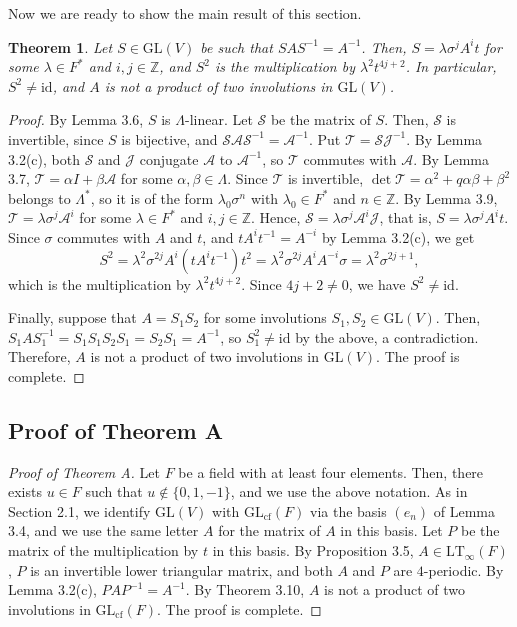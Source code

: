 \documentclass[11pt,reqno,a4paper]{amsart}
\numberwithin{equation}{section}
\newtheorem{theorem}{Theorem}[section]
\theoremstyle{definition}
\theoremstyle{plain}
\newcommand{\cf}{\mathrm{cf}}
\newcommand{\GL}{\mathrm{GL}}
\newcommand{\id}{\mathrm{id}}
\newcommand{\LT}{\mathrm{LT}_{\infty}}
\newcommand{\bbZ}{\mathbb Z}
\newcommand{\Acal}{\mathcal A}
\newcommand{\Jcal}{\mathcal J}
\newcommand{\Tcal}{\mathcal T}
\newcommand{\Scal}{\mathcal S}
\begin{document}
Now we are ready to show the main result of this section.

\begin{theorem}
Let $S\in\GL(V)$ be such that $SAS^{-1}=A^{-1}$. Then, $S=\lambda\sigma^jA^it$ for some $\lambda\in F^*$ and $i,j\in\bbZ$, and $S^2$ is the multiplication by $\lambda^2t^{4j+2}$. In particular, $S^2\ne\id$, and $A$ is not a product of two involutions in $\GL(V)$.
\end{theorem}
\begin{proof}
By Lemma 3.6, $S$ is $\Lambda$-linear. Let $\Scal$ be the matrix of $S$. Then, $\Scal$ is invertible, since $S$ is bijective, and $\Scal\Acal\Scal^{-1}=\Acal^{-1}$. Put $\Tcal=\Scal\Jcal^{-1}$. By Lemma 3.2(c), both $\Scal$ and $\Jcal$ conjugate $\Acal$ to $\Acal^{-1}$, so $\Tcal$ commutes with $\Acal$. By Lemma 3.7, $\Tcal=\alpha I+\beta\Acal$ for some $\alpha,\beta\in\Lambda$. Since $\Tcal$ is invertible, $\det\Tcal=\alpha^2+q\alpha\beta+\beta^2$ belongs to $\Lambda^*$, so it is of the form $\lambda_0\sigma^n$ with $\lambda_0\in F^*$ and $n\in\bbZ$. By Lemma 3.9, $\Tcal=\lambda\sigma^j\Acal^i$ for some $\lambda\in F^*$ and $i,j\in\bbZ$. Hence, $\Scal=\lambda\sigma^j\Acal^i\Jcal$, that is, $S=\lambda\sigma^jA^it$. Since $\sigma$ commutes with $A$ and $t$, and $tA^it^{-1}=A^{-i}$ by Lemma 3.2(c), we get
\[
S^2=\lambda^2\sigma^{2j}A^i(tA^it^{-1})t^2
=\lambda^2\sigma^{2j}A^iA^{-i}\sigma=\lambda^2\sigma^{2j+1},
\]
which is the multiplication by $\lambda^2t^{4j+2}$. Since $4j+2\ne0$, we have $S^2\ne\id$.

Finally, suppose that $A=S_1S_2$ for some involutions $S_1,S_2\in\GL(V)$. Then, $S_1AS_1^{-1}=S_1S_1S_2S_1=S_2S_1=A^{-1}$, so $S_1^2\ne\id$ by the above, a contradiction. Therefore, $A$ is not a product of two involutions in $\GL(V)$. The proof is complete.
\end{proof}

\subsection{Proof of Theorem A}
\begin{proof}[Proof of Theorem A]
Let $F$ be a field with at least four elements. Then, there exists $u\in F$ such that $u\notin\{0,1,-1\}$, and we use the above notation. As in Section 2.1, we identify $\GL(V)$ with $\GL_{\cf}(F)$ via the basis $(e_n)$ of Lemma 3.4, and we use the same letter $A$ for the matrix of $A$ in this basis. Let $P$ be the matrix of the multiplication by $t$ in this basis. By Proposition 3.5, $A\in\LT(F)$, $P$ is an invertible lower triangular matrix, and both $A$ and $P$ are $4$-periodic. By Lemma 3.2(c), $PAP^{-1}=A^{-1}$. By Theorem 3.10, $A$ is not a product of two involutions in $\GL_{\cf}(F)$. The proof is complete.
\end{proof}
\end{document}
